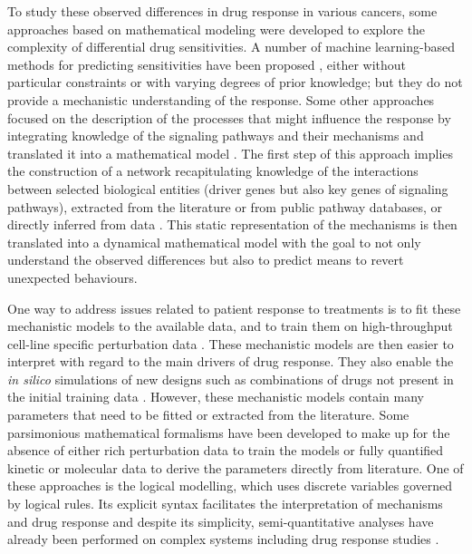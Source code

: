 \documentclass[a4paper,12pt,twoside,onecolumn,openright,final,oldfontcommands]{memoir}
\begin{document}
To study these observed differences in drug response in various cancers,
some approaches based on mathematical modeling were developed to explore
the complexity of differential drug sensitivities. A number of machine
learning-based methods for predicting sensitivities have been proposed
\citep{costello2014community}, either without particular constraints or
with varying degrees of prior knowledge; but they do not provide a
mechanistic understanding of the response. Some other approaches focused
on the description of the processes that might influence the response by
integrating knowledge of the signaling pathways and their mechanisms and
translated it into a mathematical model
\citep{eduati2017drug, jastrzebski2018integrative, frohlich2018efficient}.
The first step of this approach implies the construction of a network
recapitulating knowledge of the interactions between selected biological
entities (driver genes but also key genes of signaling pathways),
extracted from the literature or from public pathway databases, or
directly inferred from data \citep{verny2017learning}. This static
representation of the mechanisms is then translated into a dynamical
mathematical model with the goal to not only understand the observed
differences \citep{jastrzebski2018integrative} but also to predict means
to revert unexpected behaviours.

One way to address issues related to patient response to treatments is
to fit these mechanistic models to the available data, and to train them
on high-throughput cell-line specific perturbation data
\citep{eduati2017drug, jastrzebski2018integrative, klinger2013network}.
These mechanistic models are then easier to interpret with regard to the
main drivers of drug response. They also enable the \emph{in silico}
simulations of new designs such as combinations of drugs not present in
the initial training data \citep{frohlich2018efficient}. However, these
mechanistic models contain many parameters that need to be fitted or
extracted from the literature. Some parsimonious mathematical formalisms
have been developed to make up for the absence of either rich
perturbation data to train the models or fully quantified kinetic or
molecular data to derive the parameters directly from literature. One of
these approaches is the logical modelling, which uses discrete variables
governed by logical rules. Its explicit syntax facilitates the
interpretation of mechanisms and drug response
\citep{zanudo2017network, iorio2016landscape} and despite its
simplicity, semi-quantitative analyses have already been performed on
complex systems including drug response studies
\citep{knijnenburg2016logic, eduati2020patient}.
\end{document}
